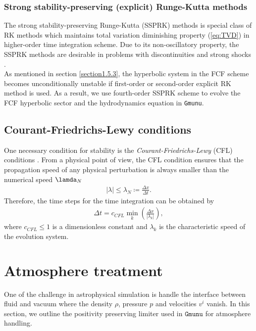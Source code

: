 \subsubsection{Strong stability-preserving (explicit) Runge-Kutta methods}
The strong stability-preserving Runge-Kutta (SSPRK) methods \cite{shu1988total,shu1988efficient}
is special class of RK methods which maintains total variation diminishing property (\ref{eq:TVD})
in higher-order time integration scheme.
Due to its non-oscillatory property,
the SSPRK methods are desirable in problems with discontinuities and strong shocks \cite{hesthaven2007nodal}.\\
As mentioned in section \ref{section1.5.3},
the hyperbolic system in the FCF scheme becomes unconditionally unstable
if first-order or second-order explicit RK method is used.
As a result, we use fourth-order SSPRK scheme to evolve the FCF hyperbolic sector 
and the hydrodynamics equation in \texttt{Gmunu}.

\subsection{Courant-Friedrichs-Lewy conditions}
One necessary condition for stability is the \textit{Courant-Friedrichs-Lewy} (CFL) conditions \cite{courant1928partiellen}.
From a physical point of view,
the CFL condition ensures that the propagation speed of any physical perturbation
is always smaller than the numerical speed $\lamda_N$
\begin{align}
    |\lambda| \leq \lambda_N \coloneqq \frac{\Delta x}{\Delta t}.
\end{align}
Therefore, the time steps for the time integration can be obtained by
\begin{align}
    \Delta t = c_{CFL} \min_k \left(\frac{\Delta x}{|\lambda_k|} \right),
\end{align}
where $c_{CFL}\leq 1$ is a dimensionless constant
and $\lambda_k$ is the characteristic speed of the evolution system.

\section{Atmosphere treatment}
One of the challenge in astrophysical simulation is handle the interface between fluid and vacuum
where the density $\rho$, pressure $p$ and velocities $v^i$ vanish.
In this section, we outline the positivity preserving limiter \cite{hu2013positivity,cheong2020gmunu_amr} used in $\texttt{Gmunu}$
for atmosphere handling.

